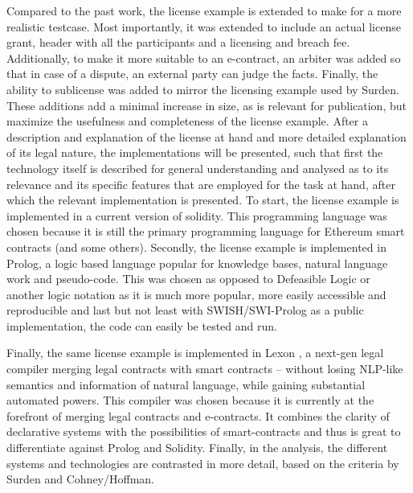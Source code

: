 \documentclass{article}
\begin{document}
Compared to the past work, the license example is extended to make for a more realistic testcase. %
Most importantly, it was extended to include an actual license grant, header with all the participants and a licensing and breach fee. Additionally, to make it more suitable to an e-contract, an arbiter was added so that in case of a dispute, an external party can judge the facts. Finally, the ability to sublicense was added to mirror the licensing example used by Surden. \cite{surdenArtificialIntelligenceLaw2019} These additions add a minimal increase in size, as is relevant for publication, but maximize the usefulness and completeness of the license example.
After a description and explanation of the license at hand and more detailed explanation of its legal nature, the implementations will be presented, such that first the technology itself is described for general understanding and analysed as to its relevance and its specific features that are employed for the task at hand, after which the relevant implementation is presented.
To start, the license example is implemented in a current version of solidity.  \cite{EthereumSolidity2020} This programming language was chosen because it is still the primary programming language for Ethereum  smart contracts (and some others).
Secondly, the license example is implemented in Prolog, \cite{SWIPrologManual} a logic based language popular for knowledge bases, natural language work and pseudo-code. This was chosen as opposed to Defeasible Logic \cite{governatoriLegalContractsImperative2018} or another logic notation as it is much more popular, more easily accessible and reproducible and last but not least with SWISH/SWI-Prolog as a public implementation, the code can easily be tested and run.

Finally, the same license example is implemented in Lexon \cite{LexonTech}, a next-gen legal compiler merging legal contracts with smart contracts %
– without losing NLP-like semantics and information of natural language, while gaining substantial automated powers. This compiler was chosen because it is currently at the forefront of merging legal contracts and e-contracts. It combines the clarity of declarative systems with the possibilities of smart-contracts and thus is great to differentiate against Prolog and Solidity.
Finally, in the analysis, the different systems and technologies are contrasted in more detail, based on the criteria by Surden and Cohney/Hoffman. \cite{cohneyTransactionalScriptsContract2020}
\end{document}
